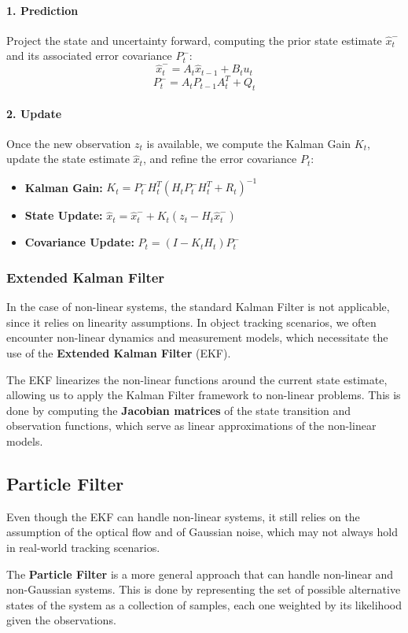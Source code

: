 \paragraph{1. Prediction}
Project the state and uncertainty forward, computing the prior state estimate $\hat{x}_t^-$ 
and its associated error covariance $P_t^-$:
\[ \hat{x}_t^- = A_t \hat{x}_{t-1} + B_t u_t \]
\[ P_t^- = A_t P_{t-1} A_t^T + Q_t \]

\paragraph{2. Update}
Once the new observation $z_t$ is available, we compute the Kalman Gain $K_t$, update the state estimate $\hat{x}_t$,
and refine the error covariance $P_t$:
\begin{itemize}
    \item \textbf{Kalman Gain:} $K_t = P_t^- H_t^T (H_t P_t^- H_t^T + R_t)^{-1}$
    \item \textbf{State Update:} $\hat{x}_t = \hat{x}_t^- + K_t (z_t - H_t \hat{x}_t^-)$
    \item \textbf{Covariance Update:} $P_t = (I - K_t H_t) P_t^-$
\end{itemize}

\subsubsection{Extended Kalman Filter}
In the case of non-linear systems, the standard Kalman Filter is not applicable, since it relies on linearity assumptions.
In object tracking scenarios, we often encounter non-linear dynamics and measurement models, which necessitate the use of the \textbf{Extended Kalman Filter} (EKF).

The EKF linearizes the non-linear functions around the current state estimate, allowing us to apply the Kalman Filter framework to non-linear problems.
This is done by computing the \textbf{Jacobian matrices} of the state transition and observation functions, which serve as linear approximations of the non-linear models.

\subsection{Particle Filter}
Even though the EKF can handle non-linear systems, it still relies on the assumption of the optical flow and of Gaussian noise, 
which may not always hold in real-world tracking scenarios.

The \textbf{Particle Filter} is a more general approach that can handle non-linear and non-Gaussian systems.
This is done by representing the set of possible alternative states of the system as a collection of samples, 
each one weighted by its likelihood given the observations.
